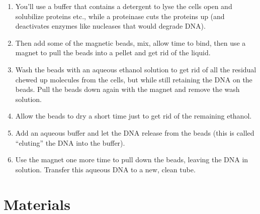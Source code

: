 \documentclass[
  letterpaper,
  DIV=11,
  numbers=noendperiod]{scrreprt}
\providecommand{\tightlist}{%
  \setlength{\itemsep}{0pt}\setlength{\parskip}{0pt}}\usepackage{longtable,booktabs,array}
\begin{document}
\begin{enumerate}
\def\labelenumi{\arabic{enumi}.}
\tightlist
\item
  You'll use a buffer that contains a detergent to lyse the cells open
  and solubilize proteins etc., while a proteinase cuts the proteins up
  (and deactivates enzymes like nucleases that would degrade DNA).
\item
  Then add some of the magnetic beads, mix, allow time to bind, then use
  a magnet to pull the beads into a pellet and get rid of the liquid.
\item
  Wash the beads with an aqueous ethanol solution to get rid of all the
  residual chewed up molecules from the cells, but while still retaining
  the DNA on the beads. Pull the beads down again with the magnet and
  remove the wash solution.
\item
  Allow the beads to dry a short time just to get rid of the remaining
  ethanol.
\item
  Add an aqueous buffer and let the DNA release from the beads (this is
  called ``eluting'' the DNA into the buffer).
\item
  Use the magnet one more time to pull down the beads, leaving the DNA
  in solution. Transfer this aqueous DNA to a new, clean tube.
\end{enumerate}

\hypertarget{materials-20}{%
\section{Materials}\label{materials-20}}
\end{document}

